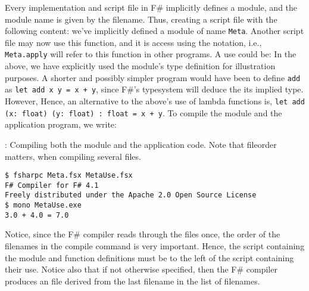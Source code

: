 Every implementation and script file in F\# implicitly defines a module, and the module name is given by the filename. Thus, creating a script file  with the following content:
%
%
we've implicitly defined a module of name \lstinline{Meta}. Another script file may now use this function, and it is access using the  notation, i.e., \lstinline{Meta.apply} will refer to this function in other programs. A use could be:
%
%
In the above, we have explicitly used the module's type definition for illustration purposes. A shorter and possibly simpler program would have been to define \lstinline{add} as \lstinline{let add x y = x + y}, since F\#'s typesystem will deduce the its implied type. However,  Hence, an alternative to the above's use of lambda functions is, \lstinline{let add (x: float) (y: float) : float = x + y}. To compile the module and the application program, we write:
\begin{codeNOutput}{: Compiling both the module and the application code. Note that fileorder matters, when compiling several files.}
\begin{lstlisting}[language=console,escapechar=§]
$ fsharpc Meta.fsx MetaUse.fsx
F# Compiler for F# 4.1
Freely distributed under the Apache 2.0 Open Source License
$ mono MetaUse.exe 
3.0 + 4.0 = 7.0
\end{lstlisting}
\end{codeNOutput}
Notice, since the F\# compiler reads through the files once, the order of the filenames in the compile command is very important. Hence, the script containing the module and function definitions must be to the left of the script containing their use. Notice also that if not otherwise specified, then the F\# compiler produces an  file derived from the last filename in the list of filenames.

